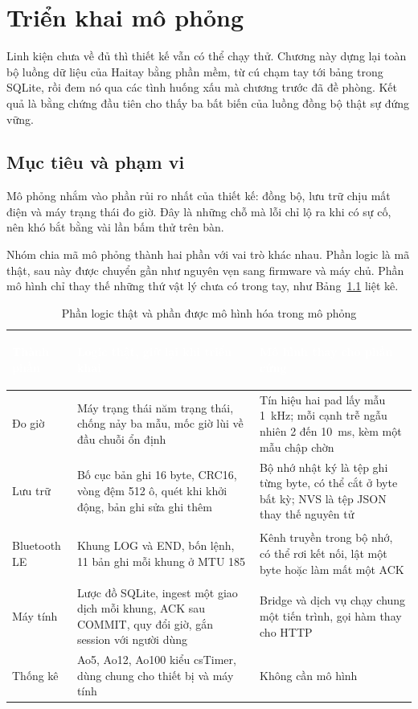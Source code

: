 \chapter{Triển khai mô phỏng}

Linh kiện chưa về đủ thì thiết kế vẫn có thể chạy thử. Chương này dựng lại toàn bộ luồng dữ liệu của Haitay bằng phần mềm, từ cú chạm tay tới bảng trong SQLite, rồi đem nó qua các tình huống xấu mà chương trước đã đề phòng. Kết quả là bằng chứng đầu tiên cho thấy ba bất biến của luồng đồng bộ thật sự đứng vững.

\section{Mục tiêu và phạm vi}
Mô phỏng nhắm vào phần rủi ro nhất của thiết kế: đồng bộ, lưu trữ chịu mất điện và máy trạng thái đo giờ. Đây là những chỗ mà lỗi chỉ lộ ra khi có sự cố, nên khó bắt bằng vài lần bấm thử trên bàn.

Nhóm chia mã mô phỏng thành hai phần với vai trò khác nhau. Phần logic là mã thật, sau này được chuyển gần như nguyên vẹn sang firmware và máy chủ. Phần mô hình chỉ thay thế những thứ vật lý chưa có trong tay, như Bảng~\ref{tab:sim-scope} liệt kê.

\begin{table}[H]
    \centering
    \small
    \renewcommand{\arraystretch}{1.4}
    \caption{Phần logic thật và phần được mô hình hóa trong mô phỏng}
    \label{tab:sim-scope}
    \begin{tabular}{>{\bfseries\raggedright\arraybackslash}m{3.2cm} >{\raggedright\arraybackslash}m{5.4cm} >{\raggedright\arraybackslash}m{5.6cm}}
        \toprule
        \rowcolor{haitayblue}
        \textcolor{white}{Thành phần} & \textcolor{white}{Logic thật, giữ lại khi triển khai} & \textcolor{white}{Mô hình thay cho phần cứng} \\
        \midrule
        \rowcolor{haitayblue!8}
        Đo giờ & Máy trạng thái năm trạng thái, chống nảy ba mẫu, mốc giờ lùi về đầu chuỗi ổn định & Tín hiệu hai pad lấy mẫu 1~kHz; mỗi cạnh trễ ngẫu nhiên 2 đến 10~ms, kèm một mẫu chập chờn \\
        Lưu trữ & Bố cục bản ghi 16 byte, CRC16, vòng đệm 512 ô, quét khi khởi động, bản ghi sửa ghi thêm & Bộ nhớ nhật ký là tệp ghi từng byte, có thể cắt ở byte bất kỳ; NVS là tệp JSON thay thế nguyên tử \\
        \rowcolor{haitayblue!8}
        Bluetooth LE & Khung LOG và END, bốn lệnh, 11 bản ghi mỗi khung ở MTU 185 & Kênh truyền trong bộ nhớ, có thể rơi kết nối, lật một byte hoặc làm mất một ACK \\
        Máy tính & Lược đồ SQLite, ingest một giao dịch mỗi khung, ACK sau COMMIT, quy đổi giờ, gắn session với người dùng & Bridge và dịch vụ chạy chung một tiến trình, gọi hàm thay cho HTTP \\
        \rowcolor{haitayblue!8}
        Thống kê & Ao5, Ao12, Ao100 kiểu csTimer, dùng chung cho thiết bị và máy tính & Không cần mô hình \\
        \bottomrule
    \end{tabular}
\end{table}

